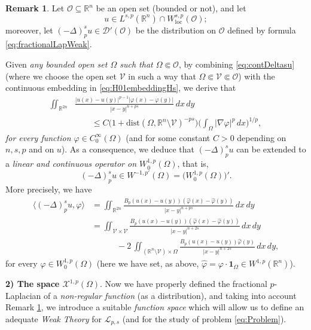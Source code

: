 \documentclass[11pt,a4paper]{amsart}
\def \R {\mathbb{R}}
\def \Oo {\mathcal{O}}
\theoremstyle{definition}
\newtheorem{remark}[definition]{Remark}
\theoremstyle{plain}
\numberwithin{equation}{section}
\begin{document}
  \begin{remark}\label{rem:HigherRegDeltaps}
   Let $\Oo\subseteq\R^n$ be an open set (bounded or not), and let 
   $$u\in {L}^{s,p}(\R^n)\cap W_{\mathrm{loc}}^{s,p}(\Oo);$$ 
   moreover, let $(-\Delta)^s_p u
   \in\mathcal{D}'(\Oo)$
   be the distribution on $\Oo$ defined by formula
   \eqref{eq:fractionalLapWeak}. 
   
   Given \emph{any bounded open set $\Omega$ such that $\Omega\Subset\Oo$},
   by combining 
   \eqref{eq:contDeltasu} (where we choose the open set $\mathcal{V}$
   in such a way that $\Omega\Subset\mathcal{V}\Subset\Oo$)
   with the con\-ti\-nuous embedding in \eqref{eq:H01embeddingHs}, we derive that
   \begin{equation*}
  \begin{split}
   \iint_{\R^{2n}}&\frac{|u(x)-u(y)|^{p-1}
 |\varphi(x)-\varphi(y)|}{|x-y|^{n+ps}}\,dx\,dy 
 \\
 & \qquad \leq C\big(1+\mathrm{dist}({\Omega},\R^n\setminus\mathcal{V})^{-ps}\big)
 \Big(\int_\Omega|\nabla \varphi|^p\,dx\Big)^{1/p},
  \end{split} 
 \end{equation*}
 \emph{for every function $\varphi\in C_0^\infty(\Omega)$} (and for some constant $C > 0$
 depending on $n,s,p$ and on $u$). As a consequence, we deduce that $(-\Delta)^s_p u$
 can be extended to a \emph{linear and continuous operator on $W_0^{1,p}(\Omega)$}, that is,
 $$(-\Delta)^s_p u\in W^{-1,p'}(\Omega) = \big(W_0^{1,p}(\Omega)\big)'.$$
 More precisely, we have
 \begin{align*}
  \langle (-\Delta)^s_p u,\varphi\rangle & = \iint_{\R^{2n}}\frac{B_p(u(x)-u(y))
 (\hat\varphi(x)-\hat\varphi(y))}{|x-y|^{n+ps}}\,dx\,dy
 \\
 & = \iint_{\mathcal{V}\times\mathcal{V}}\frac{B_p(u(x)-u(y))
 (\hat\varphi(x)-\hat\varphi(y))}{|x-y|^{n+2s}}\,dx\,dy
 \\
 &\qquad\quad-2\,\iint_{(\R^n\setminus\mathcal{V})\times\Omega}
 \frac{B_p(u(x)-u(y))\hat\varphi(y)}{|x-y|^{n+2s}}\,dx\,dy,
 \end{align*}
 for every $\varphi\in W_0^{1,p}(\Omega)$ (here we have set, as above,
 $\hat\varphi = \varphi\cdot\mathbf{1}_\Omega\in W^{1,p}(\R^n)$).
  \end{remark}
\medskip

\noindent\textbf{2) The space $\mathcal{X}^{1,p}(\Omega)$}.
Now we have pro\-per\-ly defined the fractional $p$\--La\-pla\-cian
 of a \emph{non-regular function} (as a distribu\-tion),
and taking into account Remark \ref{rem:HigherRegDeltaps}, we
introduce a suitable \emph{function space} which will allow us to define an
adequate \emph{Weak Theory} for $\mathcal{L}_{p,s}$ 
(and for the study of problem \eqref{eq:Problem}).
\vspace{0.1cm}
\end{document}
